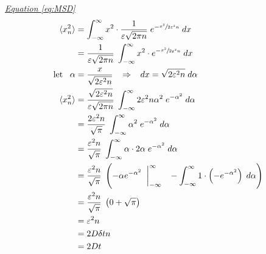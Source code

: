 \documentclass[a4paper, parskip=half]{scrartcl}
\newcommand{\myEqRef}[1]{\textit{\hyperref[eq:#1]{Equation \ref*{eq:#1}}}}
\begin{document}
\myEqRef{MSD}
\begin{align}
\langle x_n^2\rangle &= \int_{-\infty}^\infty x^2 \cdot \frac{1}{\varepsilon\sqrt{2\pi n}}\; e^{-\sfrac{x^2}{2\varepsilon^2 n}}\; dx\\
&= \frac{1}{\varepsilon\sqrt{2\pi n}} \; \int_{-\infty}^\infty x^2 \cdot e^{-\sfrac{x^2}{2\varepsilon^2 n}}\; dx \\
\mathrm{let}\;\;\; \alpha &= \frac{x}{\sqrt{2\varepsilon^2n}} \;\;\; \Rightarrow \;\;\; dx = \sqrt{2\varepsilon^2n}\;d\alpha\\
\langle x_n^2\rangle &= \frac{\sqrt{2\varepsilon^2n}}{\varepsilon\sqrt{2\pi n}} \; \int_{-\infty}^\infty 2 \varepsilon^2n\alpha^2\; e^{-\alpha^2}\; d\alpha\\
&= \frac{2\varepsilon^2n}{\sqrt{\pi}} \; \int_{-\infty}^\infty \alpha^2\; e^{-\alpha^2}\; d\alpha\\
&= \frac{\varepsilon^2n}{\sqrt{\pi}} \; \int_{-\infty}^\infty \alpha \cdot 2\alpha\; e^{-\alpha^2}\; d\alpha\\
&= \frac{\varepsilon^2n}{\sqrt{\pi}} \; \left(-\alpha e^{-\alpha^2}\;\; \bigg\vert_{-\infty}^\infty \;\;\; - \int_{-\infty}^\infty 1 \cdot \left(-e^{-\alpha^2} \right)\; d\alpha\right) \\
&= \frac{\varepsilon^2n}{\sqrt{\pi}} \; \left(0 + \sqrt{\pi} \right)\\
&= \varepsilon^2 n \\
&= 2 D \delta t n \\
&= 2 D t
\end{align}
\end{document}
